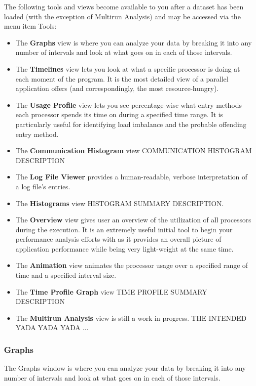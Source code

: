 \documentclass[10pt,dvips]{article}
\begin{document}
The following tools and views become available to you after a dataset
has been loaded (with the exception of Multirun Analysis) and may be
accessed via the menu item Tools:

\begin{itemize}
\item 
The {\bf Graphs} view is where you can analyze your data by breaking it
into any number of intervals and look at what goes on in each of those
intervals.
\item
The {\bf Timelines} view lets you look at what a specific processor is
doing at each moment of the program. It is the most detailed view of a
parallel application \projections{} offers (and correspondingly, the
most resource-hungry).
\item
The {\bf Usage Profile} view lets you see percentage-wise what entry
methods each processor spends its time on during a specified time range.
It is particularly useful for identifying load imbalance and the probable
offending entry method.
\item
The {\bf Communication Histogram} view COMMUNICATION HISTOGRAM DESCRIPTION
\item
The {\bf Log File Viewer} provides a human-readable, verbose
interpretation of a log file's entries.
\item
The {\bf Histograms} view HISTOGRAM SUMMARY DESCRIPTION.
\item
The {\bf Overview} view gives user an overview of the utilization of
all processors during the execution. It is an extremely useful initial
tool to begin your performance analysis efforts with as it provides an
overall picture of application performance while being very
light-weight at the same time.
\item
The {\bf Animation} view animates the processor usage over a specified
range of time and a specified interval size.
\item
The {\bf Time Profile Graph} view TIME PROFILE SUMMARY DESCRIPTION
\item
The {\bf Multirun Analysis} view is still a work in progress. THE INTENDED
YADA YADA YADA ...
\end{itemize}

\subsubsection{Graphs}
\label{sec::graph view}
The Graphs window is where you can analyze your data by breaking it
into any number of intervals and look at what goes on in each of those
intervals.
\end{document}

